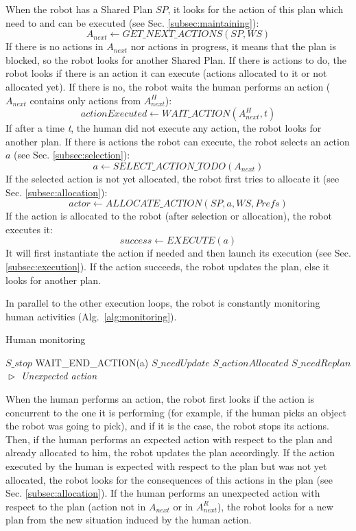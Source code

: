 \documentclass[english,a4paper,11pt,twoside]{StyleThese}
\begin{document}
When the robot has a Shared Plan $SP$, it looks for the action of this plan which need to and can be executed (see Sec. \ref{subsec:maintaining}):
$$A_{next} \leftarrow GET\_NEXT\_ACTIONS(SP, WS)$$
If there is no actions in $A_{next}$ nor actions in progress, it means that the plan is blocked, so the robot looks for another Shared Plan. If there is actions to do, the robot looks if there is an action it can execute (actions allocated to it or not allocated yet). If there is no, the robot waits the human performs an action ($A_{next}$ contains only actions from $A^H_{next}$):
$$actionExecuted \leftarrow WAIT\_ACTION(A^H_{next}, t)$$
If after a time \textit{t}, the human did not execute any action, the robot looks for another plan.
If there is actions the robot can execute, the robot selects an action $a$ (see Sec. \ref{subsec:selection}):
$$a \leftarrow SELECT\_ACTION\_TODO(A_{next})$$
If the selected action is not yet allocated, the robot first tries to allocate it (see Sec. \ref{subsec:allocation}):
$$actor \leftarrow ALLOCATE\_ACTION(SP, a, WS, Prefs)$$
If the action is allocated to the robot (after selection or allocation), the robot executes it:
$$success \leftarrow EXECUTE(a)$$
It will first instantiate the action if needed and then launch its execution (see Sec. \ref{subsec:execution}). If the action succeeds, the robot updates the plan, else it looks for another plan.

In parallel to the other execution loops, the robot is constantly monitoring human activities (Alg.~\ref{alg:monitoring}).

\begin{algorithm}
\caption{Human monitoring}
\label{alg:monitoring}
\begin{algorithmic}
\STATE $S\_stop$
\ENDIF
\STATE WAIT\_END\_ACTION(a)
\STATE $S\_needUpdate$
\STATE $S\_actionAllocated$
\ELSE 
\STATE $S\_needReplan$ \hfill \textit{$\vartriangleright$ Unexpected action}
\ENDIF
\ENDIF
\ENDWHILE
\end{algorithmic}
\end{algorithm}

When the human performs an action, the robot first looks if the action is concurrent to the one it is performing (for example, if the human picks an object the robot was going to pick), and if it is the case, the robot stops its actions.  
Then, if the human performs an expected action with respect to the plan and already allocated to him, the robot updates the plan accordingly. If the action executed by the human is expected with respect to the plan but was not yet allocated, the robot looks for the consequences of this actions in the plan (see Sec. \ref{subsec:allocation}).
If the human performs an unexpected action with respect to the plan (action not in $A_{next}$ or in $A^R_{next}$), the robot looks for a new plan from the new situation induced by the human action.
\end{document}
